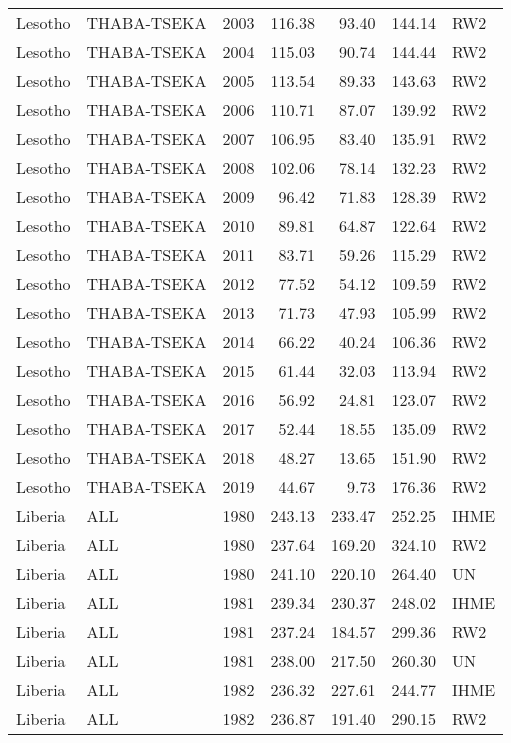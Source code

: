 \begin{longtable}{lllrrrl}
  Lesotho & THABA-TSEKA & 2003 & 116.38 & 93.40 & 144.14 & RW2 \\ 
  Lesotho & THABA-TSEKA & 2004 & 115.03 & 90.74 & 144.44 & RW2 \\ 
  Lesotho & THABA-TSEKA & 2005 & 113.54 & 89.33 & 143.63 & RW2 \\ 
  Lesotho & THABA-TSEKA & 2006 & 110.71 & 87.07 & 139.92 & RW2 \\ 
  Lesotho & THABA-TSEKA & 2007 & 106.95 & 83.40 & 135.91 & RW2 \\ 
  Lesotho & THABA-TSEKA & 2008 & 102.06 & 78.14 & 132.23 & RW2 \\ 
  Lesotho & THABA-TSEKA & 2009 & 96.42 & 71.83 & 128.39 & RW2 \\ 
  Lesotho & THABA-TSEKA & 2010 & 89.81 & 64.87 & 122.64 & RW2 \\ 
  Lesotho & THABA-TSEKA & 2011 & 83.71 & 59.26 & 115.29 & RW2 \\ 
  Lesotho & THABA-TSEKA & 2012 & 77.52 & 54.12 & 109.59 & RW2 \\ 
  Lesotho & THABA-TSEKA & 2013 & 71.73 & 47.93 & 105.99 & RW2 \\ 
  Lesotho & THABA-TSEKA & 2014 & 66.22 & 40.24 & 106.36 & RW2 \\ 
  Lesotho & THABA-TSEKA & 2015 & 61.44 & 32.03 & 113.94 & RW2 \\ 
  Lesotho & THABA-TSEKA & 2016 & 56.92 & 24.81 & 123.07 & RW2 \\ 
  Lesotho & THABA-TSEKA & 2017 & 52.44 & 18.55 & 135.09 & RW2 \\ 
  Lesotho & THABA-TSEKA & 2018 & 48.27 & 13.65 & 151.90 & RW2 \\ 
  Lesotho & THABA-TSEKA & 2019 & 44.67 & 9.73 & 176.36 & RW2 \\ 
  Liberia & ALL & 1980 & 243.13 & 233.47 & 252.25 & IHME \\ 
  Liberia & ALL & 1980 & 237.64 & 169.20 & 324.10 & RW2 \\ 
  Liberia & ALL & 1980 & 241.10 & 220.10 & 264.40 & UN \\ 
  Liberia & ALL & 1981 & 239.34 & 230.37 & 248.02 & IHME \\ 
  Liberia & ALL & 1981 & 237.24 & 184.57 & 299.36 & RW2 \\ 
  Liberia & ALL & 1981 & 238.00 & 217.50 & 260.30 & UN \\ 
  Liberia & ALL & 1982 & 236.32 & 227.61 & 244.77 & IHME \\ 
  Liberia & ALL & 1982 & 236.87 & 191.40 & 290.15 & RW2 \\ 

\end{longtable}
